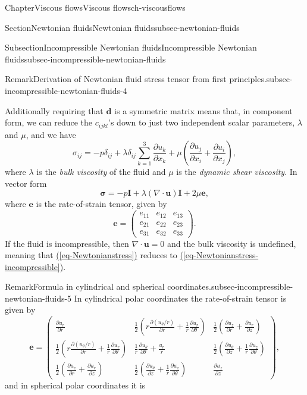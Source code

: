\documentclass[oneside,10pt,]{book}
\newcommand{\xreffont}{\relax}
\numberwithin{equation}{section}
\newcommand{\pd}[2]{\frac{\partial#1}{\partial#2}}
\newcommand{\be}{\boldsymbol{e}}
\newcommand{\bu}{\boldsymbol{u}}
\newcommand{\bsigma}{\boldsymbol{\sigma}}
\newcommand{\bd}{\boldsymbol{d}}
\newcommand{\bI}{\boldsymbol{I}}
\begin{document}
\begin{chapterptx}{Chapter}{Viscous flows}{}{Viscous flows}{}{}{ch-viscousflows}
\begin{sectionptx}{Section}{Newtonian fluids}{}{Newtonian fluids}{}{}{subsec-newtonian-fluids}
\begin{subsectionptx}{Subsection}{Incompressible Newtonian fluids}{}{Incompressible Newtonian fluids}{}{}{subsec-incompressible-newtonian-fluids}
\begin{remark}{Remark}{Derivation of Newtonian fluid stress tensor from first principles.}{subsec-incompressible-newtonian-fluids-4}
\begin{enumerate}
\end{enumerate}
Additionally requiring that \(\bd\) is a symmetric matrix means that, in component form, we can reduce the \(c_{ijkl}\)'s down to just two independent scalar parameters, \(\lambda\) and \(\mu\), and we have%
\begin{equation}
\sigma_{ij}=-p\delta_{ij}+\lambda\delta_{ij}\sum_{k=1}^3\pd{u_k}{x_k}
+\mu\left(\pd{u_j}{x_i}+\pd{u_i}{x_j}\right),\label{eq-Newtonianstress}
\end{equation}
where \(\lambda\) is the \emph{bulk viscosity} of the fluid and \(\mu\) is the \emph{dynamic shear viscosity}. In vector form%
\begin{equation*}
\bsigma=-p\bI+\lambda\left(\nabla\cdot\bu\right)\bI+2\mu\be,
\end{equation*}
where \(\be\) is the rate-of-strain tensor, given by%
\begin{equation*}
\be=\left(\begin{matrix}
e_{11}&e_{12}&e_{13}\\
e_{21}&e_{22}&e_{23}\\
e_{31}&e_{32}&e_{33}
\end{matrix}\right).
\end{equation*}
If the fluid is incompressible, then \(\nabla\cdot\bu=0\) and the bulk viscosity is undefined, meaning that \hyperref[eq-Newtonianstress]{({\xreffont\ref{eq-Newtonianstress}})} reduces to \hyperref[eq-Newtonianstress-incompressible]{({\xreffont\ref{eq-Newtonianstress-incompressible}})}.%
\end{remark}
\begin{remark}{Remark}{Formula in cylindrical and spherical coordinates.}{subsec-incompressible-newtonian-fluids-5}%
In cylindrical polar coordinates the rate-of-strain tensor is given by%
\begin{equation}
\be=\left(\begin{matrix}
\pd{u_r}{r}&\frac12\left(r\pd{(u_\theta/r)}{r}+\frac1r\pd{u_r}{\theta}\right)&\frac12\left(\pd{u_z}{r}+\pd{u_r}{z}\right)\\
\frac12\left(r\pd{(u_\theta/r)}{r}+\frac1r\pd{u_r}{\theta}\right)&\frac1r\pd{u_\theta}{\theta}+\frac{u_r}{r}&\frac12\left(\pd{u_\theta}{z}+\frac1r\pd{u_z}{\theta}\right)\\
\frac12\left(\pd{u_z}{r}+\pd{u_r}{z}\right)&\frac12\left(\pd{u_\theta}{z}+\frac1r\pd{u_z}{\theta}\right)&\pd{u_z}{z}
\end{matrix}\right),\label{eq-strainrate-cyl}
\end{equation}
and in spherical polar coordinates it is%

\end{remark}
\end{subsectionptx}
\end{sectionptx}
\end{chapterptx}
\end{document}
